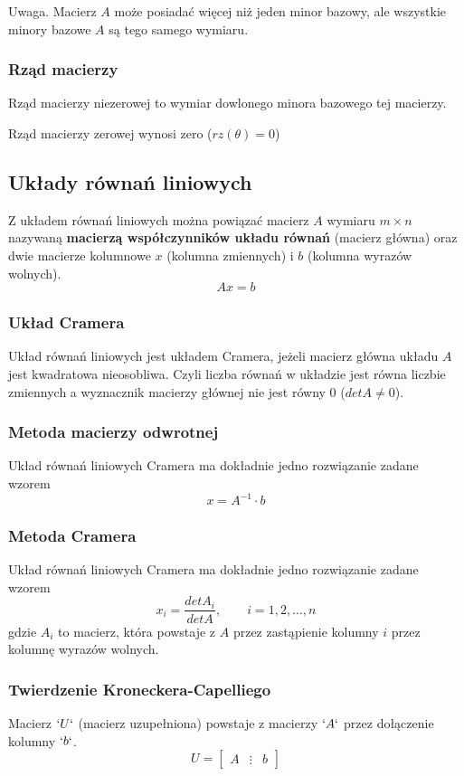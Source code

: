 \documentclass[../Matematyka.tex]{subfiles}
\begin{document}
    Uwaga. Macierz \(A\) może posiadać więcej niż jeden minor bazowy, ale wszystkie minory bazowe \(A\) są tego samego wymiaru.

    \subsubsection{Rząd macierzy}
    Rząd macierzy niezerowej to wymiar dowlonego minora bazowego tej macierzy.

    Rząd macierzy zerowej wynosi zero (\(rz(\theta) = 0\))

    \subsection{Układy równań liniowych}
    Z układem równań liniowych można powiązać macierz \(A\) wymiaru \(m \times n\) nazywaną \textbf{macierzą współczynników układu równań} (macierz główna) 
    oraz dwie macierze kolumnowe \(x\) (kolumna zmiennych) i \(b\) (kolumna wyrazów wolnych).
    \[Ax = b\]

    \subsubsection{Układ Cramera}
    Układ równań liniowych jest układem Cramera, jeżeli macierz główna układu \(A\) jest kwadratowa nieosobliwa.
    Czyli liczba równań w układzie jest równa liczbie zmiennych a wyznacznik macierzy głównej nie jest równy 0 (\(detA \neq 0\)).

    \subsubsection{Metoda macierzy odwrotnej}
    Układ równań liniowych Cramera ma dokładnie jedno rozwiązanie zadane wzorem
    \[x = A^{-1} \cdot b\]

    \subsubsection{Metoda Cramera}
    Układ równań liniowych Cramera ma dokładnie jedno rozwiązanie zadane wzorem
    \begin{displaymath}
        x_i = \frac{detA_i}{detA},
        \qquad
        i = 1, 2, \dots, n
    \end{displaymath}
    gdzie \(A_i\) to macierz, która powstaje z \(A\) przez zastąpienie kolumny \(i\) przez kolumnę wyrazów wolnych.

    \subsubsection{Twierdzenie Kroneckera-Capelliego}
    Macierz $`U`$ (macierz uzupełniona) powstaje z macierzy $`A`$ przez dołączenie kolumny $`b`$.
    \begin{displaymath}
        U =
        \begin{bmatrix}
            A & \vdots & b
        \end{bmatrix}
    \end{displaymath}
\end{document}
